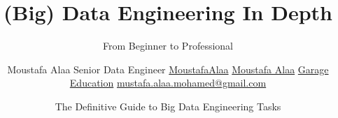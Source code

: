 \title[Data Engineering In Depth] %
{(Big) Data Engineering In Depth}

\subtitle{From Beginner to Professional}


\author[Moustafa Alaa] {
	Moustafa Alaa \newline Senior Data Engineer \newline 
	\faGithub \space \href{https://github.com/moustafaalaa/}{MoustafaAlaa}	
	\faLinkedin \space \href{https://www.linkedin.com/in/moustafa-alaa/}{Moustafa Alaa}
	 \faYoutube \space \href{https://youtube.com/c/GarageEducation}{Garage Education} \newline	\faEnvelope \space \href{mailto:mustafa.alaa.mohamed@gmail.com}{mustafa.alaa.mohamed@gmail.com} 
}


\date[\today] %
{The Definitive Guide to Big Data Engineering Tasks}



